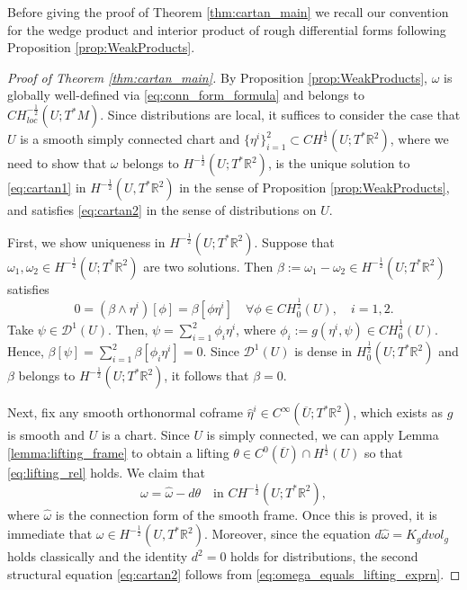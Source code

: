 \documentclass[12pt]{article}
\newcommand{\R}{\mathbb{R}}
\theoremstyle{plain}
\numberwithin{equation}{section}
\begin{document}
Before giving the proof of Theorem \ref{thm:cartan_main} we recall our convention for the wedge product and interior product of rough differential forms following Proposition \ref{prop:WeakProducts}.
    
\begin{proof}[Proof of Theorem \ref{thm:cartan_main}]
    By Proposition \ref{prop:WeakProducts}, $\omega$ is globally well-defined via \eqref{eq:conn_form_formula} and belongs to $CH^{-\frac12}_{loc}(U;T^*M)$. Since distributions are local, it suffices to consider the case that $U$ is a smooth simply connected chart and $\{\eta^i\}_{i=1}^2 \subset CH^\frac12(U;T^*\R^2)$, where we need to show that $\omega$ belongs to $H^{-\frac12}(U;T^*\R^2)$, is the unique solution to \eqref{eq:cartan1} in $H^{-\frac{1}{2}}(U,T^*\R^2)$ in the sense of Proposition \ref{prop:WeakProducts}, and satisfies \eqref{eq:cartan2} in the sense of distributions on $U$.

    First, we show uniqueness in $H^{-\frac12}(U;T^*\R^2)$. Suppose that $\omega_1, \omega_2 \in H^{-\frac12}(U;T^*\R^2)$ are two solutions. Then $\beta := \omega_1 - \omega_2 \in H^{-\frac12}(U;T^*\R^2)$ satisfies
    \begin{equation*}
        0 = (\beta \wedge \eta^i)[\phi] = \beta[\phi\eta^i] \quad \forall \phi \in CH^\frac12_0(U), \quad i = 1,2.
    \end{equation*}
    Take $\psi \in \mathcal{D}^1(U)$. Then, $\psi = \sum_{i=1}^2 \phi_i \eta^i$, where $\phi_i := g(\eta^i, \psi) \in CH^\frac12_0(U)$. Hence, $\beta[\psi] = \sum_{i=1}^2 \beta[\phi_i \eta^i] = 0$. Since $\mathcal{D}^1(U)$ is dense in $H^{\frac12}_0(U;T^*\R^2)$ and $\beta$ belongs to $H^{-\frac12}(U;T^*\R^2)$, it follows that $\beta = 0$.
    
    Next, fix any smooth orthonormal coframe $\hat\eta^i \in C^\infty(\overline U; T^* \R^2)$, which exists as $g$ is smooth and $U$ is a chart. Since $U$ is simply connected, we can apply Lemma \ref{lemma:lifting_frame} to obtain a lifting $\theta \in C^0(\overline U) \cap H^\frac12(U)$ so that \eqref{eq:lifting_rel} holds. We claim that
    \begin{equation} \label{eq:omega_equals_lifting_exprn}
        \omega = \hat\omega - d\theta \quad \text{in } CH^{-\frac12}(U;T^*\R^2),
    \end{equation}
    where $\hat\omega$ is the connection form of the smooth frame. Once this is proved, it is immediate that $\omega \in H^{-\frac{1}{2}}(U,T^*\R^2)$. Moreover, since the equation $d\hat \omega = K_g dvol_g$ holds classically and the identity $d^2 = 0$ holds for distributions, the second structural equation \eqref{eq:cartan2} follows from \eqref{eq:omega_equals_lifting_exprn}.
    

\end{proof}
\end{document}

